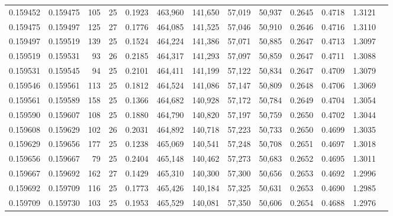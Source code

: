 \begin{tabular}{rrrrrrrrrrrrr}
0.159452 & 0.159475 & 105 &  25 &                                     0.1923 & 463,960 & 141,650 &  57,019 &  50,937 & 0.2645 & 0.4718 & 1.3121 \\
0.159475 & 0.159497 & 125 &  27 &                                     0.1776 & 464,085 & 141,525 &  57,046 &  50,910 & 0.2646 & 0.4716 & 1.3110 \\
0.159497 & 0.159519 & 139 &  25 &                                     0.1524 & 464,224 & 141,386 &  57,071 &  50,885 & 0.2647 & 0.4713 & 1.3097 \\
0.159519 & 0.159531 &  93 &  26 &                                     0.2185 & 464,317 & 141,293 &  57,097 &  50,859 & 0.2647 & 0.4711 & 1.3088 \\
0.159531 & 0.159545 &  94 &  25 &                                     0.2101 & 464,411 & 141,199 &  57,122 &  50,834 & 0.2647 & 0.4709 & 1.3079 \\
0.159546 & 0.159561 & 113 &  25 &                                     0.1812 & 464,524 & 141,086 &  57,147 &  50,809 & 0.2648 & 0.4706 & 1.3069 \\
0.159561 & 0.159589 & 158 &  25 &                                     0.1366 & 464,682 & 140,928 &  57,172 &  50,784 & 0.2649 & 0.4704 & 1.3054 \\
0.159590 & 0.159607 & 108 &  25 &                                     0.1880 & 464,790 & 140,820 &  57,197 &  50,759 & 0.2650 & 0.4702 & 1.3044 \\
0.159608 & 0.159629 & 102 &  26 &                                     0.2031 & 464,892 & 140,718 &  57,223 &  50,733 & 0.2650 & 0.4699 & 1.3035 \\
0.159629 & 0.159656 & 177 &  25 &                                     0.1238 & 465,069 & 140,541 &  57,248 &  50,708 & 0.2651 & 0.4697 & 1.3018 \\
0.159656 & 0.159667 &  79 &  25 &                                     0.2404 & 465,148 & 140,462 &  57,273 &  50,683 & 0.2652 & 0.4695 & 1.3011 \\
0.159667 & 0.159692 & 162 &  27 &                                     0.1429 & 465,310 & 140,300 &  57,300 &  50,656 & 0.2653 & 0.4692 & 1.2996 \\
0.159692 & 0.159709 & 116 &  25 &                                     0.1773 & 465,426 & 140,184 &  57,325 &  50,631 & 0.2653 & 0.4690 & 1.2985 \\
0.159709 & 0.159730 & 103 &  25 &                                     0.1953 & 465,529 & 140,081 &  57,350 &  50,606 & 0.2654 & 0.4688 & 1.2976 \\

\end{tabular}
